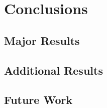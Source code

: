\chapter{Conclusions}

\section{Major Results}

\section{Additional Results}

\section{Future Work}
